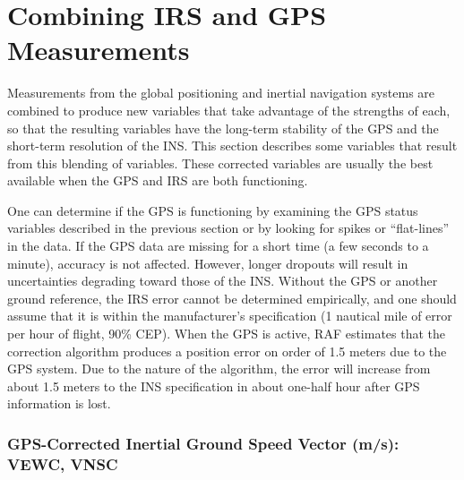 \documentclass[
]{book}
\begin{document}
\hypertarget{combining-irs-and-gps-measurements}{%
\section{Combining IRS and GPS Measurements}\label{combining-irs-and-gps-measurements}}

Measurements from the global positioning and inertial navigation systems are combined to produce new variables that take advantage of the strengths of each, so that the resulting variables have the long-term stability of the GPS and the short-term resolution of the INS. This section describes some variables that result from this blending of variables. These corrected variables are usually the best available when the GPS and IRS are both functioning.

One can determine if the GPS is functioning by examining the GPS status variables described in the previous section or by looking for spikes or ``flat-lines'' in the data. If the GPS data are missing for a short time (a few seconds to a minute), accuracy is not affected. However, longer dropouts will result in uncertainties degrading toward those of the INS. Without the GPS or another ground reference, the IRS error cannot be determined empirically, and one should assume that it is within the manufacturer's specification (1 nautical mile of error per hour of flight, 90\% CEP). When the GPS is active, RAF estimates that the correction algorithm produces a position error on order of 1.5 meters due to the GPS system. Due to the nature of the algorithm, the error will increase from about 1.5 meters to the INS specification in about one-half hour after GPS information is lost.

\hypertarget{vewc-vnsc}{%
\subsubsection*{GPS-Corrected Inertial Ground Speed Vector (m/s): VEWC, VNSC}\label{vewc-vnsc}}
\end{document}
